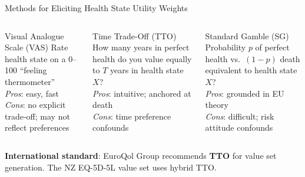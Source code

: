 \documentclass[aspectratio=169, 12pt]{beamer}
\begin{document}
\begin{frame}{Methods for Eliciting Health State Utility Weights}
  \begin{columns}
      \begin{block}{Visual Analogue Scale (VAS)}
        \small Rate health state on a 0--100 ``feeling thermometer''\\[0.2em]
        \textit{Pros}: easy, fast\\[0.1em]
        \textit{Cons}: no explicit trade-off; may not reflect preferences
      \end{block}
      \begin{alertblock}{Time Trade-Off (TTO)}
        \small How many years in perfect health do you value equally to $T$ years in health state $X$?\\[0.2em]
        \textit{Pros}: intuitive; anchored at death\\[0.1em]
        \textit{Cons}: time preference confounds
      \end{alertblock}
      \begin{block}{Standard Gamble (SG)}
        \small Probability $p$ of perfect health vs.\ $(1-p)$ death equivalent to health state $X$?\\[0.2em]
        \textit{Pros}: grounded in EU theory\\[0.1em]
        \textit{Cons}: difficult; risk attitude confounds
      \end{block}
  \end{columns}
  \vspace{0.3em}
  {\footnotesize \textbf{International standard}: EuroQol Group recommends \textbf{TTO} for value set generation. The NZ EQ-5D-5L value set uses hybrid TTO.}
\end{frame}
\end{document}
